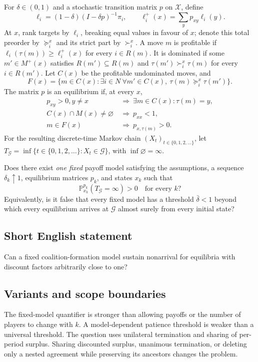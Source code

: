 \documentclass[11pt,a4paper]{article}
\begin{document}
For $\delta\in(0,1)$ and a stochastic transition matrix $p$ on $\mathcal X$, define
\[
 \ell_i=(1-\delta)(I-\delta p)^{-1}\pi_i,\qquad
 \ell_i^+(x)=\sum_y p_{xy}\ell_i(y).
\]
At $x$, rank targets by $\ell_i$, breaking equal values in favour of $x$; denote this total preorder by $\succeq_i^x$ and its strict part by $\succ_i^x$. A move $m$ is profitable if
$\ell_i(\tau(m))\geq\ell_i^+(x)$ for every $i\in R(m)$. It is dominated if some $m'\in M^+(x)$ satisfies $R(m')\subseteq R(m)$ and
$\tau(m')\succ_i^x\tau(m)$ for every $i\in R(m')$.
Let $C(x)$ be the profitable undominated moves, and
\[
 F(x)=\{m\in C(x):\exists i\in N\ \forall m'\in C(x),\
                  \tau(m)\succeq_i^x\tau(m')\}.
\]
The matrix $p$ is an equilibrium if, at every $x$,
\begin{align*}
 p_{xy}>0, y\neq x&\ \Longrightarrow\ \exists m\in C(x):\tau(m)=y,\\
 C(x)\cap M(x)\neq\varnothing&\ \Longrightarrow\ p_{xx}<1,\\
 m\in F(x)&\ \Longrightarrow\ p_{x,\tau(m)}>0.
\end{align*}
For the resulting discrete-time Markov chain $(X_t)_{t\in\{0,1,2,\ldots\}}$, let
$T_{\mathcal G}=\inf\{t\in\{0,1,2,\ldots\}:X_t\in\mathcal G\}$, with $\inf\varnothing=\infty$.

Does there exist \emph{one fixed} payoff model satisfying the assumptions, a sequence $\delta_k\uparrow1$, equilibrium matrices $p_k$, and states $x_k$ such that
\[
 \mathbb P_{x_k}^{p_k}(T_{\mathcal G}=\infty)>0\quad\text{for every }k?
\]
Equivalently, is it false that every fixed model has a threshold $\bar\delta<1$ beyond which every equilibrium arrives at $\mathcal G$ almost surely from every initial state?

\subsection*{Short English statement}
Can a fixed coalition-formation model sustain nonarrival for equilibria with discount factors arbitrarily close to one?

\subsection*{Variants and scope boundaries}
The fixed-model quantifier is stronger than allowing payoffs or the number of players to change with $k$. A model-dependent patience threshold is weaker than a universal threshold. The question uses unilateral termination and sharing of per-period surplus. Sharing discounted surplus, unanimous termination, or deleting only a nested agreement while preserving its ancestors changes the problem.
\end{document}
